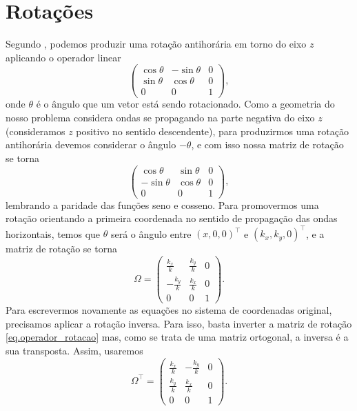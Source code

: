 \section{Rota\c{c}\~oes}

Segundo \cite{lang_1986}, podemos produzir uma rota\c{c}\~ao antihor\'aria em torno do eixo $z$ aplicando o operador linear
\begin{equation*}
\begin{pmatrix}
\cos\theta&-\sin\theta&0\\
\sin\theta&\cos\theta&0\\
0&0&1
\end{pmatrix},
\end{equation*}
onde $\theta$ \'e o \^angulo que um vetor est\'a sendo rotacionado. Como a geometria do nosso problema considera ondas se propagando na parte negativa do eixo $z$ (consideramos $z$ positivo no sentido descendente), para produzirmos uma rota\c{c}\~ao antihor\'aria devemos considerar o \^angulo $-\theta$, e com isso nossa matriz de rota\c{c}\~ao se torna
\begin{equation*}
\begin{pmatrix}
\cos\theta&\sin\theta&0\\
-\sin\theta&\cos\theta&0\\
0&0&1
\end{pmatrix},
\end{equation*}
lembrando a paridade das fun\c{c}\~oes seno e cosseno. Para promovermos uma rota\c{c}\~ao orientando a primeira coordenada  no sentido de propaga\c{c}\~ao das ondas horizontais, temos que $\theta$ ser\'a o \^angulo entre $(x,0,0)^\top$ e $(k_x,k_y,0)^\top$, e a matriz de rota\c{c}\~ao se torna
\begin{equation}\label{eq.operador_rotacao}
\Omega=
\begin{pmatrix}
\frac{k_x}{k}&\frac{k_y}{k}&0\\
-\frac{k_y}{k}&\frac{k_x}{k}&0\\
0&0&1
\end{pmatrix}.
\end{equation}
Para escrevermos novamente as equa\c{c}\~oes no sistema de coordenadas original, precisamos aplicar a rota\c{c}\~ao inversa. Para isso, basta inverter a matriz de rota\c{c}\~ao \ref{eq.operador_rotacao} mas, como se trata de uma matriz ortogonal, a inversa \'e a sua transposta. Assim, usaremos
\begin{equation}\label{eq.rotacao_inversa}
\Omega^\top=
\begin{pmatrix}
\frac{k_x}{k}&-\frac{k_y}{k}&0\\
\frac{k_y}{k}&\frac{k_x}{k}&0\\
0&0&1
\end{pmatrix}.
\end{equation}



